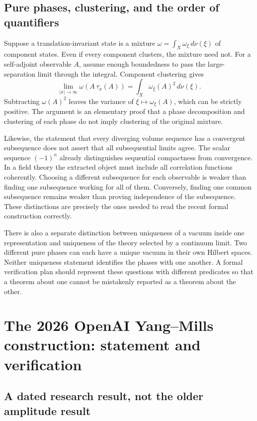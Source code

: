 \section{Pure phases, clustering, and the order of quantifiers}

Suppose a translation-invariant state is a mixture
$\omega=\int_X\omega_\xi\,d\nu(\xi)$ of component states.
Even if every component clusters, the mixture need not.  For a self-adjoint
observable $A$, assume enough boundedness to pass the large-separation
limit through the integral.  Component clustering gives
\[
 \lim_{|x|\to\infty}\omega(A\,\tau_x(A))
 =\int_X\omega_\xi(A)^2\,d\nu(\xi).
\]
Subtracting $\omega(A)^2$ leaves the variance of
$\xi\mapsto\omega_\xi(A)$, which can be strictly positive.
The argument is an elementary proof that a phase decomposition and
clustering of each phase do not imply clustering of the original mixture.

Likewise, the statement that every diverging volume sequence has a
convergent subsequence does not assert that all subsequential limits agree.
The scalar sequence $(-1)^n$ already distinguishes sequential compactness
from convergence.  In a field theory the extracted object must include all
correlation functions coherently.  Choosing a different subsequence for
each observable is weaker than finding one subsequence working for all of
them.  Conversely, finding one common subsequence remains weaker than
proving independence of the subsequence.  These distinctions are precisely
the ones needed to read the recent formal construction correctly.

There is also a separate distinction between uniqueness of a vacuum inside
one representation and uniqueness of the theory selected by a continuum
limit.  Two different pure phases can each have a unique vacuum in their
own Hilbert spaces.  Neither uniqueness statement identifies the phases
with one another.  A formal verification plan should represent these
questions with different predicates so that a theorem about one cannot be
mistakenly reported as a theorem about the other.

\chapter{The 2026 OpenAI Yang--Mills construction: statement and verification}
\label{chap:openai-ym}

\section{A dated research result, not the older amplitude result}

